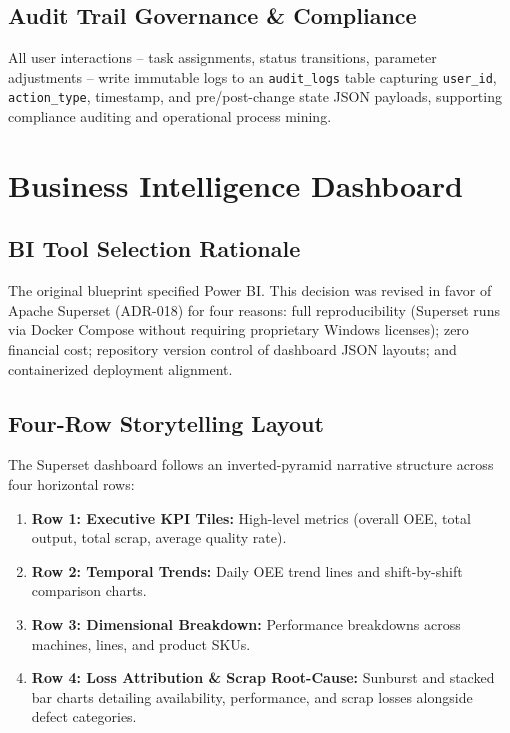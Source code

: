 \documentclass[12pt, a4paper]{report}
\begin{document}
\section{Audit Trail Governance \& Compliance}
All user interactions -- task assignments, status transitions, parameter adjustments -- write immutable logs to an \texttt{audit\_logs} table capturing \texttt{user\_id}, \texttt{action\_type}, timestamp, and pre/post-change state JSON payloads, supporting compliance auditing and operational process mining.

\chapter{Business Intelligence Dashboard}
\label{chap:dashboard}

\section{BI Tool Selection Rationale}
The original blueprint specified Power BI. This decision was revised in favor of Apache Superset (ADR-018) for four reasons: full reproducibility (Superset runs via Docker Compose without requiring proprietary Windows licenses); zero financial cost; repository version control of dashboard JSON layouts; and containerized deployment alignment.

\section{Four-Row Storytelling Layout}
The Superset dashboard follows an inverted-pyramid narrative structure across four horizontal rows:
\begin{enumerate}
    \item \textbf{Row 1: Executive KPI Tiles:} High-level metrics (overall OEE, total output, total scrap, average quality rate).
    \item \textbf{Row 2: Temporal Trends:} Daily OEE trend lines and shift-by-shift comparison charts.
    \item \textbf{Row 3: Dimensional Breakdown:} Performance breakdowns across machines, lines, and product SKUs.
    \item \textbf{Row 4: Loss Attribution \& Scrap Root-Cause:} Sunburst and stacked bar charts detailing availability, performance, and scrap losses alongside defect categories.
\end{enumerate}
\end{document}
